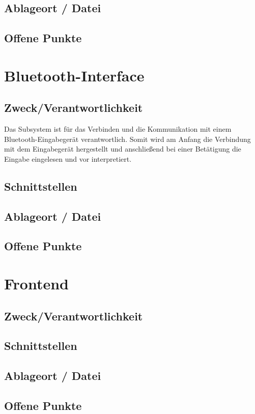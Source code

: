 \subsection*{Ablageort / Datei}
\subsection*{Offene Punkte}

\section{Bluetooth-Interface}
\subsection*{Zweck/Verantwortlichkeit}
Das Subsystem ist für das Verbinden und die Kommunikation mit einem Bluetooth-Eingabegerät verantwortlich. Somit wird am Anfang die Verbindung mit dem Eingabegerät hergestellt und anschließend bei einer Betätigung die Eingabe eingelesen und vor interpretiert.
\subsection*{Schnittstellen}
\subsection*{Ablageort / Datei}
\subsection*{Offene Punkte}

\section{Frontend}
\subsection*{Zweck/Verantwortlichkeit}
\subsection*{Schnittstellen}
\subsection*{Ablageort / Datei}
\subsection*{Offene Punkte}


